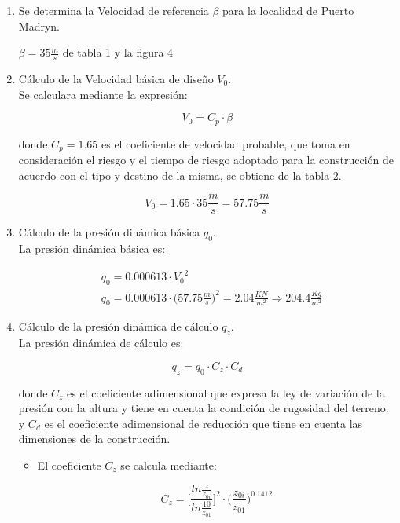 \newpage
\begin{enumerate}
\item Se determina la Velocidad de referencia $\beta$ para la localidad de Puerto Madryn.\\

	\begin{center}
		$\beta=35 \frac{m}{s}$ de tabla 1 y la figura 4
	\end{center}

\item Cálculo de la Velocidad básica de diseño $V_0$.\\
Se calculara mediante la expresión:

$$V_0=C_p \cdot \beta$$

donde $C_p=1.65$ es el coeficiente de velocidad probable, que toma en consideración el riesgo y el tiempo de riesgo adoptado para la construcción de acuerdo con el tipo y destino de la misma, se obtiene de la tabla 2.

$$V_0=1.65 \cdot 35 \frac{m}{s} = 57.75 \frac{m}{s}$$

\item Cálculo de la presión dinámica básica $q_0$.\\
La presión dinámica básica es:

	\begin{align*}
	& q_0=0.000613 \cdot {V_0}^2 \\
	& q_0=0.000613 \cdot {\Big(57.75 \frac{m}{s}\Big)}^2=2.04 \frac{KN}{m^2} \Rightarrow 204.4 \frac{Kg}{m^2}
	\end{align*}

\item Cálculo de la presión dinámica de cálculo $q_z$.\\
La presión dinámica de cálculo es:

$$q_z=q_0 \cdot C_z \cdot C_d$$

donde $C_z$ es el coeficiente adimensional que expresa la ley de variación de la presión con la altura y tiene en cuenta la condición de rugosidad del terreno.\\
y $C_d$ es el coeficiente adimensional de reducción  que tiene en cuenta las dimensiones de la construcción.\\

\begin{itemize}
\item El coeficiente $C_z$ se calcula mediante:



$$C_z= \Bigg[\frac{ln\frac{z}{z_{0i}}} {ln\frac{10}{z_{01}}}\Bigg]^2 \cdot \Bigg(\frac{z_{0i}}{z_{01}}\Bigg)^{0.1412}$$


\end{itemize}
\end{enumerate}
